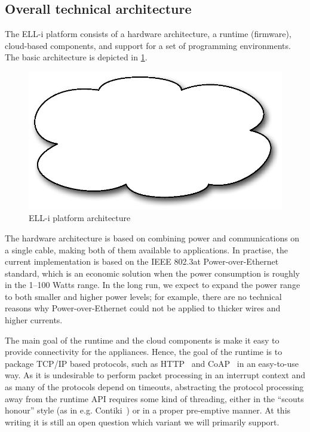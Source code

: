 \documentclass[final]{siamltex}
\begin{document}
\subsection{Overall technical architecture}

The ELL-i platform consists of a hardware architecture, a runtime
(firmware), cloud-based components, and support for a set of
programming environments.  The basic architecture is depicted in
\ref{fig:arch}.

\begin{figure}
\centering
\includegraphics[scale=.4]{figure-arch.eps}
\caption{ELL-i platform architecture}
\label{fig:arch}
\end{figure}

The hardware architecture is based on combining power and
communications on a single cable, making both of them available to
applications.  In practise, the current implementation is based on the
IEEE 802.3at Power-over-Ethernet standard, which is an economic
solution when the power consumption is roughly in the 1--100 Watts
range.  In the long run, we expect to expand the power range to both
smaller and higher power levels; for example, there are no technical
reasons why Power-over-Ethernet could not be applied to thicker wires
and higher currents.

The main goal of the runtime and the cloud components is make it easy
to provide connectivity for the appliances.  Hence, the goal of the
runtime is to package TCP/IP based protocols, such as HTTP~\cite{HTTP}
and CoAP~\cite{CoAP} in an easy-to-use way.  As it is undesirable to
perform packet processing in an interrupt context and as many of the
protocols depend on timeouts, abstracting the protocol processing away
from the runtime API requires some kind of threading, either in the
``scouts honour'' style (as in e.g. Contiki~\cite{Contiki-scheduler})
or in a proper pre-emptive manner.  At this writing it is still an
open question which variant we will primarily support.
\end{document}
